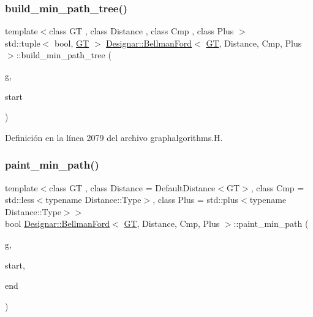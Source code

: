 \subsubsection{\texorpdfstring{build\+\_\+min\+\_\+path\+\_\+tree()}{build\_min\_path\_tree()}}
{\footnotesize\ttfamily template$<$class GT , class Distance , class Cmp , class Plus $>$ \\
std\+::tuple$<$ bool, \hyperlink{demo-buildgraph_8_c_a3001c40d2c31ca87ed96cd7d1334a55e}{GT} $>$ \hyperlink{class_designar_1_1_bellman_ford}{Designar\+::\+Bellman\+Ford}$<$ \hyperlink{demo-buildgraph_8_c_a3001c40d2c31ca87ed96cd7d1334a55e}{GT}, Distance, Cmp, Plus $>$\+::build\+\_\+min\+\_\+path\+\_\+tree (\begin{DoxyParamCaption}\item[{\hyperlink{demo-buildgraph_8_c_a3001c40d2c31ca87ed96cd7d1334a55e}{GT} \&}]{g,  }\item[{Node \&}]{start }\end{DoxyParamCaption})}



Definición en la línea 2079 del archivo graphalgorithms.\+H.

\mbox{\label{class_designar_1_1_bellman_ford_aa3bbfc0acd202d4af5e10f7405e8a25c}} 
\subsubsection{\texorpdfstring{paint\+\_\+min\+\_\+path()}{paint\_min\_path()}}
{\footnotesize\ttfamily template$<$class GT , class Distance  = Default\+Distance$<$\+G\+T$>$, class Cmp  = std\+::less$<$typename Distance\+::\+Type$>$, class Plus  = std\+::plus$<$typename Distance\+::\+Type$>$$>$ \\
bool \hyperlink{class_designar_1_1_bellman_ford}{Designar\+::\+Bellman\+Ford}$<$ \hyperlink{demo-buildgraph_8_c_a3001c40d2c31ca87ed96cd7d1334a55e}{GT}, Distance, Cmp, Plus $>$\+::paint\+\_\+min\+\_\+path (\begin{DoxyParamCaption}\item[{\hyperlink{demo-buildgraph_8_c_a3001c40d2c31ca87ed96cd7d1334a55e}{GT} \&}]{g,  }\item[{Node \&}]{start,  }\item[{Node \&}]{end }\end{DoxyParamCaption})\hspace{0.3cm}{\ttfamily [inline]}}



